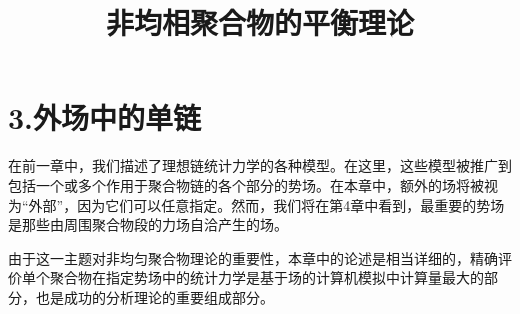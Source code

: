 \documentclass[12pt,a4paper]{article}
\title{非均相聚合物的平衡理论}
\author{}
\date{\chntoday}
\numberwithin{equation}{section}
\begin{document}
\maketitle
\section{}
\section{}
\section{3.外场中的单链}
在前一章中，我们描述了理想链统计力学的各种模型。在这里，这些模型被推广到包括一个或多个作用于聚合物链的各个部分的势场。在本章中，额外的场将被视为“外部”，因为它们可以任意指定。然而，我们将在第4章中看到，最重要的势场是那些由周围聚合物段的力场自洽产生的场。

由于这一主题对非均匀聚合物理论的重要性，本章中的论述是相当详细的，精确评价单个聚合物在指定势场中的统计力学是基于场的计算机模拟中计算量最大的部分，也是成功的分析理论的重要组成部分。






\cite{tam19912d}

\end{document}
